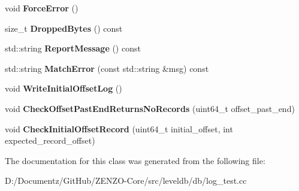\begin{DoxyCompactItemize}
void {\bfseries Force\+Error} ()
\item 
\mbox{\label{classleveldb_1_1log_1_1_log_test_a092d7cb6d95b2f101d89dbee74ee15ad}} 
size\+\_\+t {\bfseries Dropped\+Bytes} () const
\item 
\mbox{\label{classleveldb_1_1log_1_1_log_test_a2010f1dfcd23d4cdf295909d0a00ba84}} 
std\+::string {\bfseries Report\+Message} () const
\item 
\mbox{\label{classleveldb_1_1log_1_1_log_test_a51c102136e6f0b4b9567ebad8dff74f1}} 
std\+::string {\bfseries Match\+Error} (const std\+::string \&msg) const
\item 
\mbox{\label{classleveldb_1_1log_1_1_log_test_af0053e30c5ccaa5e2e10d595a4f48565}} 
void {\bfseries Write\+Initial\+Offset\+Log} ()
\item 
\mbox{\label{classleveldb_1_1log_1_1_log_test_a2bf9cdf3b3f722c300f65a7752c0e101}} 
void {\bfseries Check\+Offset\+Past\+End\+Returns\+No\+Records} (uint64\+\_\+t offset\+\_\+past\+\_\+end)
\item 
\mbox{\label{classleveldb_1_1log_1_1_log_test_ab9ca8c2014e78611d66d884f7b46e4ff}} 
void {\bfseries Check\+Initial\+Offset\+Record} (uint64\+\_\+t initial\+\_\+offset, int expected\+\_\+record\+\_\+offset)
\end{DoxyCompactItemize}


The documentation for this class was generated from the following file\+:\begin{DoxyCompactItemize}
\item 
D\+:/\+Documentz/\+Git\+Hub/\+Z\+E\+N\+Z\+O-\/\+Core/src/leveldb/db/log\+\_\+test.\+cc\end{DoxyCompactItemize}
